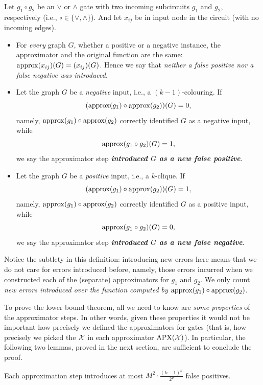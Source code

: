 \begin{definition}\label{def:new-errors}
Let $g_1\circ g_2$ be an $\lor$ or $\land$ gate with two incoming subcircuits $g_1$ and $g_2$, respectively (i.e., $\circ\in\{\lor,\land\}$). And let $x_{ij}$ be in input node in the circuit (with no incoming edges).
\begin{itemize}
\item 
For \emph{every} graph $G$, whether a positive or a  negative instance, the approximator and the original function are the same:  
${\rm approx}(x_{ij})(G)=(x_{ij})(G)$. Hence we say that \emph{neither a false positive nor a false negative was introduced}.   
 
\item 
Let the graph $G$ be a \emph{negative} input, i.e., a $(k-1)$-colouring. If 
$$({\rm approx}(g_1)\circ {\rm approx}(g_2))(G)=0,$$ namely, ${\rm approx}(g_1)\circ {\rm approx}(g_2)$ correctly identified $G$ as a negative input, 
while $${\rm approx}(g_1\circ g_2)(G)=1,$$ we say the approximator 
step \emph{\textbf{introduced $G$ as a new false positive}}. 

\item Let the graph $G$ be a \emph{positive} input, i.e., a $k$-clique. If 
$$({\rm approx}(g_1) \circ {\rm approx}(g_2))(G)=1,$$
 namely, ${\rm approx}(g_1)\circ {\rm approx}(g_2)$ correctly identified $G$ as a positive input, while 
$${\rm approx}(g_1\circ g_2)(G)=0,$$ we say the approximator step \textbf{\emph{introduced $G$ as a new false negative}}.
\end{itemize}
\end{definition}

Notice the  subtlety in this definition: introducing new errors here means that we do not care for errors introduced before, namely, those errors incurred  when we constructed each of the (separate) approximators for $g_1$ and $g_2$. We only count \emph{new errors introduced over the function computed by ${\rm approx}(g_1)\circ {\rm approx}(g_2)$}.







To prove the lower bound theorem, all we need to know are \emph{some properties} of the approximator steps. In other words, given these properties it would not be important how precisely we defined the approximators for gates (that is, how precisely we picked the $\mathcal{X}$ in each approximator $\mathrm{APX}(\mathcal{X})$).
In particular, the following two lemmas, proved in the next section, are sufficient to conclude the proof. 
\begin{lemma}\label{lem:new-false-positives}
Each approximation step introduces at most $M^2 \cdot \frac{(k-1)^n}{2^p}$ false positives.
\end{lemma}

